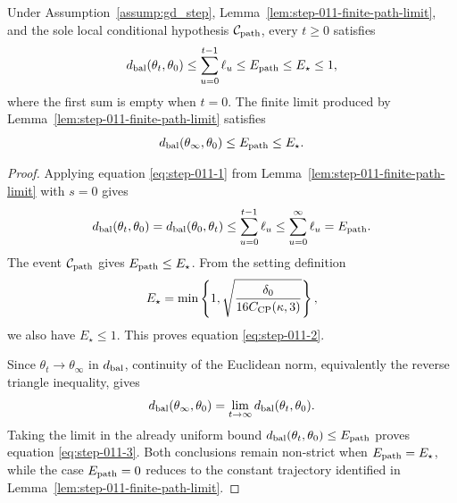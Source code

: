 \begin{proposition}
\label{prop:step-011-path-radius}
\leavevmode\par\noindent
Under Assumption~\ref{assump:gd_step},
Lemma~\ref{lem:step-011-finite-path-limit}, and the sole local conditional
hypothesis \(\mathcal C_{\rm path}\), every \(t\ge0\) satisfies
\begin{equation}
  d_{\rm bal}(\theta_t,\theta_0)
  \le\sum_{u=0}^{t-1}\ell_u
  \le E_{\rm path}
  \le E_\star
  \le1,                                                  \label{eq:step-011-2}
\end{equation}
where the first sum is empty when \(t=0\). The finite limit produced by
Lemma~\ref{lem:step-011-finite-path-limit} satisfies
\begin{equation}
  d_{\rm bal}(\theta_\infty,\theta_0)
  \le E_{\rm path}
  \le E_\star.                                          \label{eq:step-011-3}
\end{equation}

\end{proposition}

\begin{proof}
Applying equation \eqref{eq:step-011-1} from
Lemma~\ref{lem:step-011-finite-path-limit} with \(s=0\) gives
\[
  d_{\rm bal}(\theta_t,\theta_0)
  =d_{\rm bal}(\theta_0,\theta_t)
  \le\sum_{u=0}^{t-1}\ell_u
  \le\sum_{u=0}^{\infty}\ell_u
  =E_{\rm path}.
\]
The event \(\mathcal C_{\rm path}\) gives
\(E_{\rm path}\le E_\star\). From the setting definition
\[
  E_\star
  =\min\left\{1,
    \sqrt{\frac{\delta_0}{16C_{\rm CP}(\kappa,3)}}\right\},
\]
we also have \(E_\star\le1\). This proves equation \eqref{eq:step-011-2}.

Since \(\theta_t\to\theta_\infty\) in \(d_{\rm bal}\), continuity of the
Euclidean norm, equivalently the reverse triangle inequality, gives
\[
  d_{\rm bal}(\theta_\infty,\theta_0)
  =\lim_{t\to\infty}d_{\rm bal}(\theta_t,\theta_0).
\]
Taking the limit in the already uniform bound
\(d_{\rm bal}(\theta_t,\theta_0)\le E_{\rm path}\) proves equation \eqref{eq:step-011-3}.
Both conclusions remain non-strict when \(E_{\rm path}=E_\star\), while the
case \(E_{\rm path}=0\) reduces to the constant trajectory identified in
Lemma~\ref{lem:step-011-finite-path-limit}. 

\end{proof}


